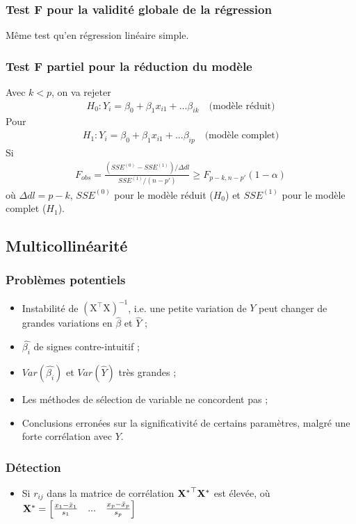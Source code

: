 \documentclass[10pt, french]{article}
\begin{document}
\begin{multicols*}{3}
\subsubsection*{Test F pour la validité globale de la régression}
Même test qu'en régression linéaire simple.


\subsubsection*{Test F partiel pour la réduction du modèle}
Avec $k < p$, on va rejeter
\begin{align*}
H_0 : Y_i = \beta_0 + \beta_1 x_{i1} + ... \beta_{ik} \quad \text{(modèle réduit)}
\end{align*}
Pour
\begin{align*}
H_1 : Y_i = \beta_0 + \beta_1 x_{i1} + ... \beta_{ip} \quad \text{(modèle complet)}
\end{align*}
Si
\begin{align*}
F_{obs} = \frac{(SSE^{(0)} - SSE^{(1)}) / \Delta dl}{SSE^{(1)} / (n-p')} \geq F_{p-k, n-p'}(1- \alpha)
\end{align*}
où $\Delta dl = p - k$, $SSE^{(0)}$ pour le modèle réduit ($H_0$) et $SSE^{(1)}$ pour le modèle complet ($H_1$).

\subsection*{Multicollinéarité}
\subsubsection*{Problèmes potentiels}
\begin{itemize}
\item Instabilité de $\mathrm{(X^\top X)^{-1}}$, i.e. une petite variation de $Y$ peut changer de grandes variations en $\hat{\beta}$ et $\hat{Y}$ ;
\item $\hat{\beta_i}$ de signes contre-intuitif ;
\item $Var(\hat{\beta_i})$ et $Var(\hat{Y})$ très grandes ;
\item Les méthodes de sélection de variable ne concordent pas ;
\item Conclusions erronées sur la significativité de certains paramètres, malgré une forte corrélation avec $Y$.
\end{itemize}

\subsubsection*{Détection}
\begin{itemize}
\item Si $r_{ij}$ dans la matrice de corrélation $\mathbf{{X^*}^\top X^*}$ est élevée, où $\mathbf{X^*} = \begin{bmatrix}
\frac{x_1 - \bar{x}_1}{s_1} & ... & \frac{x_p - \bar{x}_p}{s_p}
\end{bmatrix}$


\end{itemize}
\end{multicols*}
\end{document}
